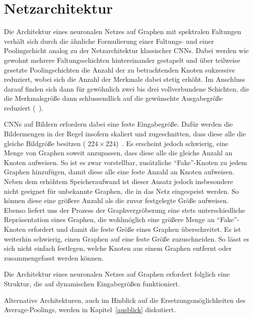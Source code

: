 \section{Netzarchitektur}
\label{spektrale_netzarchitektur}

Die Architektur eines neuronalen Netzes auf Graphen mit spektralen Faltungen verhält sich durch die ähnliche Formulierung einer Faltungs- und einer Poo\-ling\-sch\-icht analog zu der Netzarchitektur klassischer \glspl{CNN}.
Dabei werden wie gewohnt mehrere Faltungsschichten hintereinander gestapelt und über teilweise gesetzte Poolingschichten die Anzahl der zu betrachtenden Knoten sukzessive reduziert, wobei sich die Anzahl der Merkmale dabei stetig erhöht.
Im Anschluss darauf finden sich dann für gewöhnlich zwei bis drei vollverbundene Schichten, die die Merkmalsgröße dann schlussendlich auf die gewünschte Ausgabegröße reduziert (\vgl{}~\cite{Nielsen}).

\glspl{CNN} auf Bildern erfordern dabei eine feste Eingabegröße.
Dafür werden die Bildermengen in der Regel insofern skaliert und zugeschnitten, dass diese alle die gleiche Bildgröße besitzen (\zB{} $224 \times 224$)~\cite{spp}.
Es erscheint jedoch schwierig, eine Menge von Graphen soweit anzupassen, dass diese alle die gleiche Anzahl an Knoten aufweisen.
So ist es zwar vorstellbar, zusätzliche \enquote{Fake}-Knoten zu jedem Graphen hinzufügen, damit diese alle eine feste Anzahl an Knoten aufweisen.
Neben dem erhöhtem Speicheraufwand ist dieser Ansatz jedoch insbesondere nicht geeignet für unbekannte Graphen, die in das Netz eingespeist werden.
So können diese \evtl{} eine größere Anzahl als die zuvor festgelegte Größe aufweisen.
Ebenso liefert uns der Prozess der Graphvergröberung eine stets unterschiedliche Repräsentation eines Graphen, die wohlmöglich eine größere Menge an \enquote{Fake}-Knoten erfordert und damit die feste Größe eines Graphen überschreitet.
Es ist weiterhin schwierig, einen Graphen auf eine feste Größe zuzuschneiden.
So lässt es sich nicht einfach festlegen, welche Knoten aus einem Graphen entfernt oder zusammengefasst werden können.

Die Architektur eines neuronalen Netzes auf Graphen erfordert folglich eine Struktur, die auf dynamischen Eingabegrößen funktioniert.

Alternative Architekturen, auch im Hinblick auf die Ersetzungsmöglichkeiten \bzgl{} des Average-Poolings, werden in Kapitel~\ref{ausblick} diskutiert.
